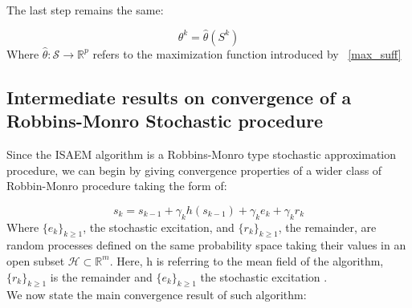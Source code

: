 \documentclass[a4paper]{article}
\theoremstyle{plain}
\theoremstyle{plain}
\theoremstyle{definition}
\begin{document}
The last step remains the same:

\begin{equation}
\theta^k = \hat{\theta}(S^{k})
\end{equation}
Where $\hat{\theta}: \mathcal{S} \to \mathbb{R}^p$ refers to the maximization function introduced by ~\ref{max_suff}\\


\subsection{Intermediate results on convergence of a Robbins-Monro Stochastic procedure}
Since the ISAEM algorithm is a Robbins-Monro type stochastic approximation procedure, we can begin by giving convergence properties of a wider class of Robbin-Monro procedure taking the form of:

\begin{equation}
s_k = s_{k-1} + \gamma_k h(s_{k-1}) +\gamma_k e_k + \gamma_k r_k
\end{equation}
Where $\{e_k\}_{k \geq 1}$, the stochastic excitation, and $\{r_k\}_{k \geq 1}$, the remainder, are random processes defined on the same probability space taking their values in an open subset $\mathcal{H} \subset \mathbb{R}^m$.
Here, h is referring to the mean field of the algorithm,$\{r_k\}_{k \geq 1}$ is the remainder and $\{e_k\}_{k \geq 1}$ the stochastic excitation .\\
We now state the main convergence result of such algorithm:
\end{document}
